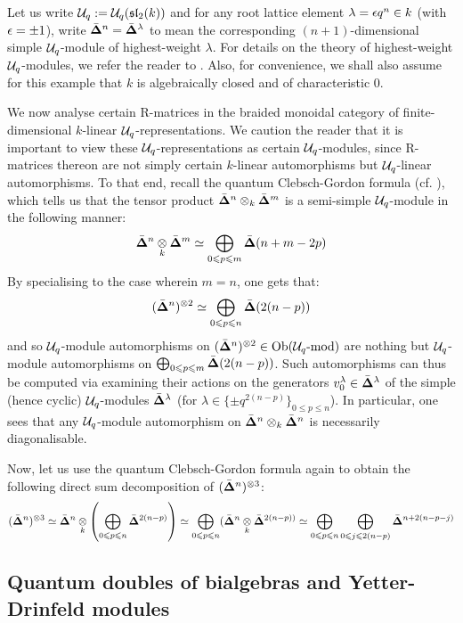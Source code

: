         \begin{example}
            Let us write $\mathcal{U}_q := \mathcal{U}_q(\mathfrak{sl}_2(k))$ and for any root lattice element $\lambda = \epsilon q^n\in k$ (with $\epsilon = \pm 1$), write $\bar{ \mathbf{ \Delta } }^n = \bar{ \mathbf{ \Delta } }^{\lambda}$ to mean the corresponding $(n + 1)$-dimensional simple $\mathcal{U}_q$-module of highest-weight $\lambda$. For details on the theory of highest-weight $\mathcal{U}_q$-modules, we refer the reader to \cite[Chapters VI and VII]{kassel_quantum_groups}. Also, for convenience, we shall also assume for this example that $k$ is algebraically closed and of characteristic $0$. 
            
            We now analyse certain R-matrices in the braided monoidal category of finite-dimensional $k$-linear $\mathcal{U}_q$-representations. We caution the reader that it is important to view these $\mathcal{U}_q$-representations as certain $\mathcal{U}_q$-modules, since R-matrices thereon are not simply certain $k$-linear automorphisms but $\mathcal{U}_q$-linear automorphisms. To that end, recall the quantum Clebsch-Gordon formula (cf. \cite[Theorem VII.7.1]{kassel_quantum_groups}), which tells us that the tensor product $\qsimple^n \tensor_k \qsimple^m$ is a semi-simple $\mathcal{U}_q$-module in the following manner:
                $$\qsimple^n \tensor_k \qsimple^m \cong \bigoplus_{0 \leq p \leq m} \qsimple(n + m - 2p)$$
            By specialising to the case wherein $m = n$, one gets that:
                $$(\qsimple^n)^{\tensor 2} \cong \bigoplus_{0 \leq p \leq n} \qsimple(2(n - p))$$
            and so $\mathcal{U}_q$-module automorphisms on $(\qsimple^n)^{\tensor 2} \in \Ob(\calU_q\mod)$ are nothing but $\mathcal{U}_q$-module automorphisms on $\bigoplus_{0 \leqslant p \leqslant m} \bar{ \mathbf{ \Delta } }(2(n - p))$. Such automorphisms can thus be computed via examining their actions on the generators $v^{\lambda}_0 \in \bar{ \mathbf{ \Delta } }^{\lambda}$ of the simple (hence cyclic) $\mathcal{U}_q$-modules $\bar{ \mathbf{ \Delta } }^{\lambda}$ (for $\lambda \in \{\pm q^{ 2(n - p) }\}_{0 \leq p \leq n}$). In particular, one sees that any $\mathcal{U}_q$-module automorphism on $\qsimple^n \tensor_k \qsimple^n$ is necessarily diagonalisable. 
            
            Now, let us use the quantum Clebsch-Gordon formula again to obtain the following direct sum decomposition of $(\qsimple^n)^{\tensor 3}$:
                $$(\qsimple^n)^{\tensor 3} \cong \qsimple^n \tensor_k \left( \bigoplus_{0 \leq p \leq n} \qsimple^{2(n - p)} \right) \cong \bigoplus_{0 \leq p \leq n} ( \qsimple^n \tensor_k \qsimple^{2(n - p))} \cong \bigoplus_{0 \leq p \leq n} \bigoplus_{0 \leq j \leq 2(n - p)} \qsimple^{n + 2(n - p - j)}$$
        \end{example}
    
    \subsection{Quantum doubles of bialgebras and Yetter-Drinfeld modules}